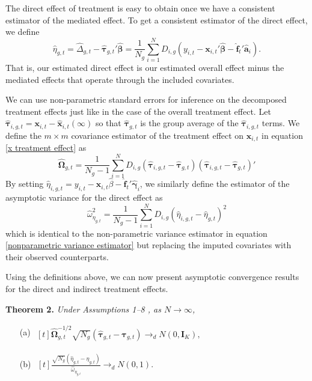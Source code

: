 \documentclass[12pt,fleqn]{article}
\def\*#1{\mathbf{#1}}
\def\+#1{\boldsymbol{#1}}
\begin{document}
The direct effect of treatment is easy to obtain once we have a consistent estimator of the mediated effect. To get a consistent estimator of the direct effect, we define 
\begin{equation}
    \widehat{\eta}_{g,t} = \widehat{\Delta}_{g,t} - \widehat{\+\tau}_{g,t}' \widehat{\+\beta} = \frac{1}{N_g} \sum_{i = 1}^N D_{i,g} (y_{i,t} - \*x_{i,t}' \widehat{\+\beta} - \widehat{\*f}_t' \widehat{\*a}_i).
\end{equation}
That is, our estimated direct effect is our estimated overall effect minus the mediated effects that operate through the included covariates.

We can use non-parametric standard errors for inference on the decomposed treatment effects just like in the case of the overall treatment effect. Let $\widehat{\+\tau}_{i,g,t} = \*x_{i,t} - \widehat{\*x}_{i,t}(\infty)$ so that $\widehat{\+\tau}_{g,t}$ is the group average of the $\widehat{\+\tau}_{i,g,t}$ terms. We define the $m \times m$ covariance estimator of the treatment effect on $\*x_{i,t}$ in equation \eqref{x treatment effect} as 
\begin{equation}
    \widehat{\+\Omega}_{g, t} = \frac{1}{N_g - 1} \sum_{i = 1}^N D_{i,g} \left( \widehat{\+\tau}_{i,g,t} - \widehat{\+\tau}_{g,t} \right) \left( \widehat{\+\tau}_{i,g,t} - \widehat{\+\tau}_{g,t} \right)' 
\end{equation}
By setting $\widehat{\eta}_{i,g,t} = y_{i,t} - \*x_{i,t} \widehat{\beta} - \widehat{\*f}_t' \widehat{\+\gamma}_i$, we similarly define the estimator of the asymptotic variance for the direct effect as 
\begin{equation}
    \widehat{\omega}^2_{\eta_{g,t}} = \frac{1}{N_g - 1} \sum_{i = 1}^N D_{i,g} \left( \widehat{\eta}_{i,g,t} - \widehat{\eta}_{g,t} \right)^2
\end{equation}
which is identical to the non-parametric variance estimator in equation \eqref{nonparametric variance estimator} but replacing the imputed covariates with their observed counterparts. 

Using the definitions above, we can now present asymptotic convergence results for the direct and indirect treatment effects.

\noindent \textbf{Theorem 2.} \emph{Under Assumptions 1--8 , as $N\to\infty$,}
\begin{itemize}
  \item[(a)] $\begin{aligned}[t]
    \widehat{\+\Omega}_{g, t}^{-1/2} \sqrt{N_g} \left( \widehat{\+\tau}_{g,t} - \+\tau_{g,t} \right) \to_d N(0, \*I_K ),
    \end{aligned}$

  \item[(b)] $\begin{aligned}[t]
    \frac{\sqrt{N_g} \left(  \widehat \eta_{g,t} - \eta_{g,t} \right)}{\widehat{\omega}_{\eta_{g,t}}}  \to_d N(0,1).
    \end{aligned}$
\end{itemize}
\end{document}
